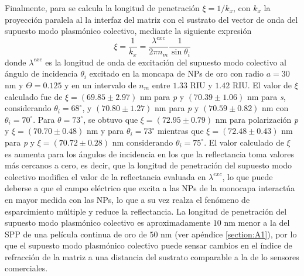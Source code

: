 Finalmente, para se calcula la longitud de penetración $\xi=1/k_x$, con $k_x$ la proyección paralela al la interfaz del matriz con el sustrato del vector de onda del supuesto modo plasmónico colectivo, mediante la siguiente expresión
%
\begin{equation}
\xi=\frac{1}{k_x}= \frac{\lambda^{exc}}{2\pi n_m}\frac{1}{\sin\theta_i}
\label{eq:penetracion}
\end{equation}
%
donde $\lambda^{exc}$ es la longitud de onda de excitación del supuesto modo colectivo al ángulo de incidencia $\theta_i$ excitado en la moncapa de NPs de oro con radio $a=30$ nm y $\Theta=0.125$  y en un intervalo de $n_m$ entre $1.33$ RIU y $1.42$ RIU. El valor de $\xi$ calculado fue de $\xi= (69.85\pm 2.97)$ nm para \emph{p} y $(70.39\pm 1.06)$ nm para \emph{s}, considerando $\theta_i=68^\circ$, y $(70.80\pm 1.27)$ nm para \emph{p} y $(70.59\pm0.82)$ nm con  $\theta_i=70^\circ$. Para $\theta=73^\circ$, se obtuvo que $\xi=(72.95\pm 0.79)$ nm para polarización \emph{p} y $\xi=(70.70\pm 0.48)$ nm y para $\theta_i=73^\circ$ mientras que $\xi=(72.48\pm0.43)$ nm para \emph{p} y $\xi=(70.72\pm 0.28)$ nm considerando $\theta_i=75^\circ$. El valor calculado de $\xi$ es aumenta para los ángulos de incidencia en los que la reflectancia toma valores más cercanos a cero,  es decir, que la longitud de penetración del supuesto modo colectivo modifica el valor de la reflectancia evaluada en $\lambda^{exc}$, lo que puede deberse a que el campo eléctrico que excita a las NPs de la monocapa interactúa en mayor medida con las NPs, lo que a su vez realza el fenómeno de esparcimiento múltiple y reduce la reflectancia. La longitud de penetración del supuesto modo plasmónico colectivo es aproximadamente $10$ nm  menor a la del SPP de una película continua de oro de $50$ nm (ver apéndice \ref{section:A1}), por lo que el supuesto modo plasmónico colectivo puede sensar cambios en el índice de refracción de la matriz a una distancia del sustrato comparable a la de lo sensores comerciales.


























